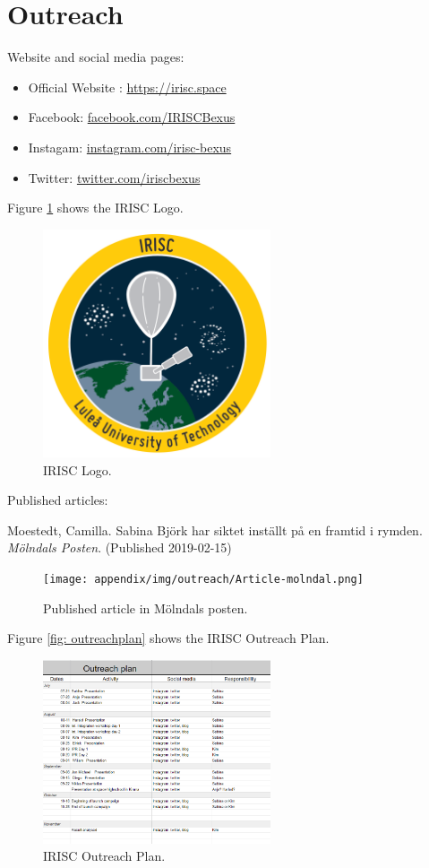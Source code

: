 \newpage
\section{Outreach} \label{sec:appB}

Website and social media pages: 

\begin{itemize}
	\item Official Website : \url{https://irisc.space}
	\item Facebook: \url{facebook.com/IRISCBexus}
	\item Instagam: \url{instagram.com/irisc-bexus}
	\item Twitter: \url{twitter.com/iriscbexus}
\end{itemize}

Figure \ref{fig:loggo} shows the IRISC Logo.

\begin{figure}[H]
	\centering
	\includegraphics[width=0.6\textwidth]{0-cover/img/logo-irisc.png}
	\caption{IRISC Logo.}
	\label{fig:loggo}
\end{figure}

Published articles: 

Moestedt, Camilla. Sabina Björk har siktet inställt på en framtid i rymden. \textit{Mölndals Posten}. (Published 2019-02-15)

\begin{figure}[H]
	\centering
	\texttt{[image: appendix/img/outreach/Article-molndal.png]}
	\caption{Published article in Mölndals posten.}
	\label{fig:outreachplan}
\end{figure}

Figure \ref{fig: outreachplan} shows the IRISC Outreach Plan.

\begin{figure}[H]
	\centering
	\includegraphics[width=0.6\textwidth]{appendix/img/outreach/Outreachplan.png}
	\caption{IRISC Outreach Plan.}
	\label{fig:outreachplan}
\end{figure}